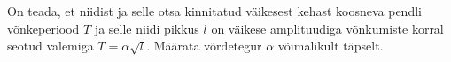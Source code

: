 On teada, et niidist ja selle otsa kinnitatud väikesest kehast koosneva pendli
võnkeperiood $T$ ja selle niidi pikkus $l$ on väikese amplituudiga võnkumiste
korral seotud valemiga $T = \alpha\sqrt{l}$. Määrata võrdetegur $\alpha$
võimalikult täpselt.
